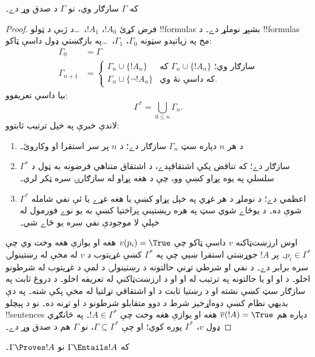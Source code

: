 \documentclass[../../../include/open-logic-section]{subfiles}
\begin{document}
\begin{thm}[بشپړتيا]
که $\Gamma$ سازګار وي، نو $\Gamma$ د صدق وړ دے۔
\end{thm}

\begin{proof}
فرض کړئ $!A_0$، $!A_1$،~\dots د ژبې د ټولو !!{formula}s بشپړ نوملړ دے۔ د !!{formula}s مخ په زياتېدو سټونه $\Gamma_0$، $\Gamma_1$،~\dots په بازګښتي ډول داسې ټاکو:
\begin{align*}
\Gamma_0 & = \Gamma\\
\Gamma_{n+1} &  =
\begin{cases}
  \Gamma_n \cup \{!A_n\} & \text{که $\Gamma_n \cup \{!A_n\}$ سازګار وي؛}\\
  \Gamma_n \cup \{\lnot !A_n\} & \text{که داسې نۀ وي}.
\end{cases}
\end{align*}
بيا داسې تعريفوو:
\[
\Gamma^* = \bigcup_{0\le n}\Gamma_n.
\]
لاندې خبرې په خپل ترتيب ثابتوو:
\begin{enumerate}
\item د هر $n$ دپاره سټ $\Gamma_n$ سازګار دے؛ د $n$ پر سر استقرا او  وکاروئ۔
\item $\Gamma^*$ سازګار دے؛ که تناقض پکې اشتقاقېدے، د اشتقاق متناهي فرضونه به ټول د سلسلې په يوه پړاو کښې وو، چې د هغه پړاو له سازګارۍ سره ټکر لري۔
\item $\Gamma^*$ اعظمي دے؛ د نوملړ د هر غړي په خپل پړاو کښې يا هغه غړے يا ئې نفي شامله شوې ده۔ د يوځاے شوي سټ په هره ريښتينې پراختيا کښې به يو نوے فورمول له خپلې لا موجودې نفي سره يو ځاے شي۔
\end{enumerate}
اوس ارزښت‌ټاکنه $v$ داسې ټاکو چې $v(p_i) = \True$ هغه او يوازې هغه وخت وي چې $p_i \in \Gamma^*$۔ پر $!A$ جوړښتي استقرا ښيي چې په $\Gamma^*$ کښې غړيتوب د $v$ له مخې له رښتينولۍ سره برابر دے۔ د نفي او شرطي تړنې حالتونه د رښتينولۍ د لمې د غړيتوب له شرطونو اخلو۔ د او او يا حالتونه په ترتيب له  او  او د ارزښت‌ټاکنې له تعريفه اخلو۔ د دروغ ثابت په سازګار سټ کښې نشته او د رښتيا ثابت د  او اشتقاقي تړلتيا له مخې پکې شته۔ په دې بديهي نظام کښې دوه‌اړخيز شرط د دوو متقابلو شرطونو د او تړنه ده۔ نو د پېچلو !!{sentence}s دپاره هم $\overline{v}(!A) = \True$ هغه او يوازې هغه وخت چې $!A \in \Gamma^*$۔ په ځانګړي ډول $v$، $\Gamma^*$ پوره کوي؛ او چې $\Gamma \subseteq \Gamma^*$، نو $\Gamma$ هم د صدق وړ دے۔
\end{proof}

\begin{cor}
که $\Gamma \Entails !A$ نو $\Gamma \Proves !A$۔
\end{cor}
\end{document}
